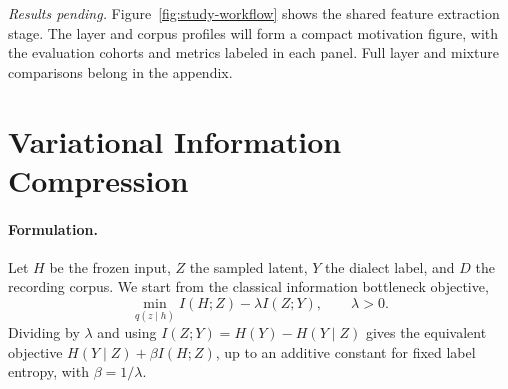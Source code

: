 \documentclass[11pt]{article}
\begin{document}
\emph{Results pending.} Figure~\ref{fig:study-workflow} shows the shared feature extraction stage. The layer and corpus profiles will form a compact motivation figure, with the evaluation cohorts and metrics labeled in each panel. Full layer and mixture comparisons belong in the appendix.

\section{Variational Information Compression}
\paragraph{Formulation.}
Let \(H\) be the frozen input, \(Z\) the sampled latent, \(Y\) the dialect label, and \(D\) the recording corpus. We start from the classical information bottleneck objective,
\[
  \min_{q(z\mid h)} I(H;Z)-\lambda I(Z;Y), \qquad \lambda>0.
\]
Dividing by \(\lambda\) and using \(I(Z;Y)=H(Y)-H(Y\mid Z)\) gives the equivalent objective \(H(Y\mid Z)+\beta I(H;Z)\), up to an additive constant for fixed label entropy, with \(\beta=1/\lambda\).
\end{document}
